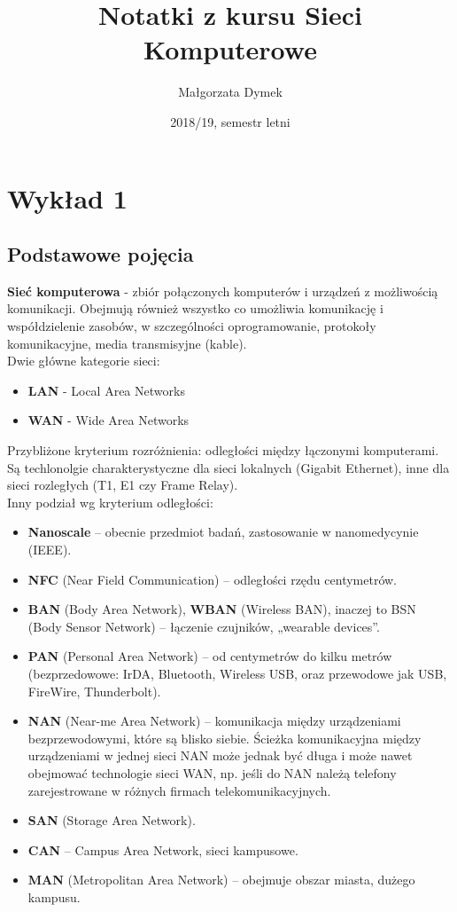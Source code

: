 \documentclass[a4paper]{article}
\title{Notatki z kursu Sieci Komputerowe}
\author{Małgorzata Dymek}
\date{2018/19, semestr letni}
\begin{document}
\maketitle

\section{Wykład 1}
\subsection{Podstawowe pojęcia}
\textbf{Sieć komputerowa} - zbiór połączonych komputerów i urządzeń z możliwością komunikacji. Obejmują	również	wszystko co	umożliwia
komunikację i współdzielenie zasobów, w szczególności oprogramowanie, protokoły komunikacyjne, media transmisyjne (kable).
\\
Dwie główne kategorie sieci:
\begin{itemize}
    \item \textbf{LAN} - Local Area Networks
    \item \textbf{WAN} - Wide Area Networks
\end{itemize}

Przybliżone  kryterium	 rozróżnienia: odległości między łączonymi	komputerami. Są techlonolgie charakterystyczne dla
sieci	lokalnych (Gigabit Ethernet),	inne dla sieci rozległych (T1,	E1	czy	Frame	Relay).
\\
Inny podział wg kryterium odległości:
\begin{itemize}
    \item \textbf{Nanoscale} – obecnie przedmiot badań, zastosowanie w nanomedycynie (IEEE).
    \item \textbf{NFC} (Near Field Communication) – odległości	rzędu	centymetrów.
    \item \textbf{BAN} (Body Area Network),	\textbf{WBAN} (Wireless	BAN),	inaczej to	BSN	(Body	Sensor	Network) – łączenie	czujników,	„wearable	devices”.
    \item \textbf{PAN} (Personal Area Network) – od centymetrów	do	kilku metrów (bezprzedowowe: IrDA,	Bluetooth,	Wireless USB,	oraz	przewodowe	jak	USB,	FireWire,
Thunderbolt).
    \item \textbf{NAN} (Near-me	Area	Network)	– komunikacja	między	urządzeniami bezprzewodowymi, które	są	blisko	siebie. Ścieżka	komunikacyjna	między	urządzeniami	w	jednej	sieci	NAN	może jednak	być	długa	i	może	nawet	obejmować	technologie	sieci	WAN,	np.	jeśli	do	NAN	należą telefony	zarejestrowane	w	różnych	firmach	telekomunikacyjnych.
    \item \textbf{SAN} (Storage	Area	Network).
    \item \textbf{CAN} – Campus	Area	Network,	sieci	kampusowe.
    \item \textbf{MAN} (Metropolitan	Area	Network)	– obejmuje	obszar	miasta,	dużego	kampusu.
\end{itemize}
\end{document}
